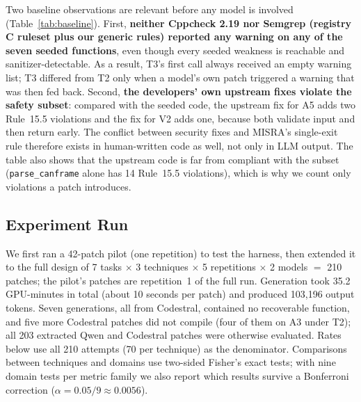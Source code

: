 \documentclass[12pt]{IEEEtran}
\begin{document}
Two baseline observations are relevant before any model is involved (Table~\ref{tab:baseline}). First, \textbf{neither Cppcheck 2.19 nor Semgrep (registry C ruleset plus our generic rules) reported any warning on any of the seven seeded functions}, even though every seeded weakness is reachable and sanitizer-detectable. As a result, T3's first call always received an empty warning list; T3 differed from T2 only when a model's own patch triggered a warning that was then fed back. Second, \textbf{the developers' own upstream fixes violate the safety subset}: compared with the seeded code, the upstream fix for A5 adds two Rule~15.5 violations and the fix for V2 adds one, because both validate input and then return early. The conflict between security fixes and MISRA's single-exit rule therefore exists in human-written code as well, not only in LLM output. The table also shows that the upstream code is far from compliant with the subset (\texttt{parse\_canframe} alone has 14 Rule~15.5 violations), which is why we count only violations a patch introduces.

\subsection{Experiment Run}
We first ran a 42-patch pilot (one repetition) to test the harness, then extended it to the full design of 7 tasks $\times$ 3 techniques $\times$ 5 repetitions $\times$ 2 models $=$ 210 patches; the pilot's patches are repetition~1 of the full run. Generation took 35.2 GPU-minutes in total (about 10 seconds per patch) and produced 103,196 output tokens. Seven generations, all from Codestral, contained no recoverable function, and five more Codestral patches did not compile (four of them on A3 under T2); all 203 extracted Qwen and Codestral patches were otherwise evaluated. Rates below use all 210 attempts (70 per technique) as the denominator. Comparisons between techniques and domains use two-sided Fisher's exact tests; with nine domain tests per metric family we also report which results survive a Bonferroni correction ($\alpha = 0.05/9 \approx 0.0056$).

\begin{table}[t]
    \centering
    \caption{Results by technique (both models and domains, $n=70$ per technique)}
    \label{tab:technique}
    \footnotesize
\end{table}
\end{document}
